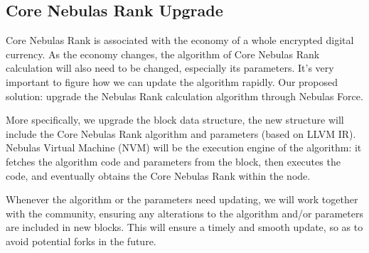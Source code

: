 \subsection{Core Nebulas Rank Upgrade}
Core Nebulas Rank is associated with the economy of a whole encrypted digital currency. As the economy changes, the algorithm of Core Nebulas Rank calculation will also need to be changed, especially its parameters. It’s very important to figure how we can update the algorithm rapidly. Our proposed solution: upgrade the Nebulas Rank calculation algorithm through Nebulas Force.

More specifically, we upgrade the block data structure, the new structure will include the Core Nebulas Rank algorithm and parameters (based on LLVM IR). Nebulas Virtual Machine (NVM) will be the execution engine of the algorithm: it fetches the algorithm code and parameters from the block, then executes the code, and eventually obtains the Core Nebulas Rank within the node.

Whenever the algorithm or the parameters need updating, we will work together with the community, ensuring any alterations to the algorithm and/or parameters are included in new blocks. This will ensure a timely and smooth update, so as to avoid potential forks in the future.


